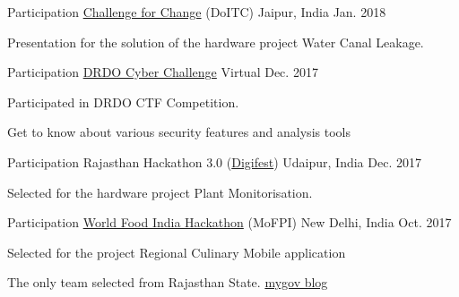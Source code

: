 
\begin{cventries}

  \cventry
	{Participation} %
	{\href{http://change.rajasthan.gov.in/catches/index}{Challenge for Change} (DoITC)} %
	{Jaipur, India} %
	{Jan. 2018} %
	{
		\begin{cvitems} %
			\item {Presentation for the solution of the hardware project Water Canal Leakage.}
		\end{cvitems}
	}


  \cventry
	{Participation} %
	{\href{https://innovate.mygov.in/drdo-cyberchallenge/}{DRDO Cyber Challenge}} %
	{Virtual} %
	{Dec. 2017} %
	{
		\begin{cvitems} %
			\item {Participated in DRDO CTF Competition.}
			\item {Get to know about various security features and analysis tools}
		\end{cvitems}
	}

  \cventry
	{Participation} %
	{Rajasthan Hackathon 3.0 (\href{http://digifest.rajasthan.gov.in/udaipurhackathon.aspx}{Digifest})} %
	{Udaipur, India} %
	{Dec. 2017} %
	{
		\begin{cvitems} %
			\item {Selected for the hardware project Plant Monitorisation.}
		\end{cvitems}
	}

  \cventry
	{Participation} %
	{\href{https://innovate.mygov.in/world-food-india-hackathon-2017/}{World Food India Hackathon} (MoFPI)} %
	{New Delhi, India} %
	{Oct. 2017} %
	{
		\begin{cvitems} %
			\item {Selected for the project Regional Culinary Mobile application}
			\item {The only team selected from Rajasthan State. \href{https://blog.mygov.in/announcing-shortlisted-entries-for-world-food-india-hackathon-2017-final-round/}{mygov blog}}
		\end{cvitems}
	}


\end{cventries}
